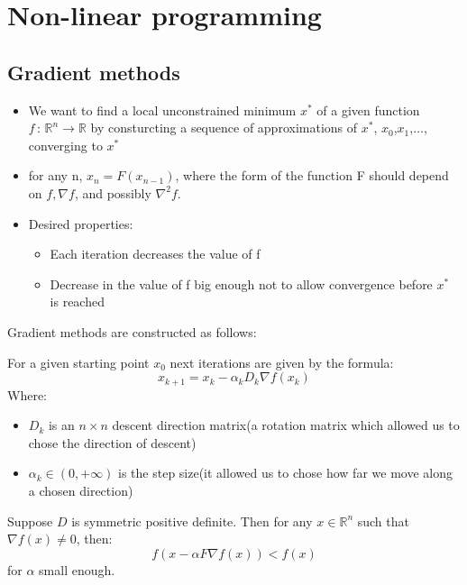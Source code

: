 
\chapter{Non-linear programming}

\section{Gradient methods}
\begin{itemize}
        \item We want to find a local unconstrained minimum $x^{*}$ of a given function $f\,:\,\mathbb{R}^{n} \longrightarrow \mathbb{R} $ by
            consturcting a sequence of approximations of $x^{*}$, $x_0$,$x_1$,$\dots $, converging to $x^{*}$
        \item for any n, $x_n = F(x_{n-1})$, where the form of the function F should depend on  $f, \nabla f$, and possibly  $\nabla^{2}f$.
        \item Desired properties:
            \begin{itemize}
                    \item Each iteration decreases the value of f
                    \item Decrease in the value of f big enough not to allow convergence before $x^{*}$ is reached
                    
            \end{itemize}
\end{itemize}

Gradient methods are constructed as follows:
{
    For a given starting point $x_0$ next iterations are given by the formula:
    \begin{equation}
        x_{k+1} = x_k - \alpha_k D_k \nabla f(x_k)
    \end{equation}
    Where:
    \begin{itemize}
            \item $D_k$ is an  $n\times n$ descent direction matrix(a rotation matrix which allowed us to chose the direction of descent)
            \item  $\alpha_k \in (0,+\infty)$ is the step size(it allowed us to chose how far we move along a chosen direction)
            
    \end{itemize}
}
\thm{}
{
    Suppose $D$ is symmetric positive definite. Then for any  $x\in \mathbb{R}^{n}$ such that $\nabla f(x) \neq 0$, then:
     \begin{equation}
        f(x-\alpha F \nabla f(x)) < f(x)
    \end{equation}
    for $\alpha$ small enough.
}
        

